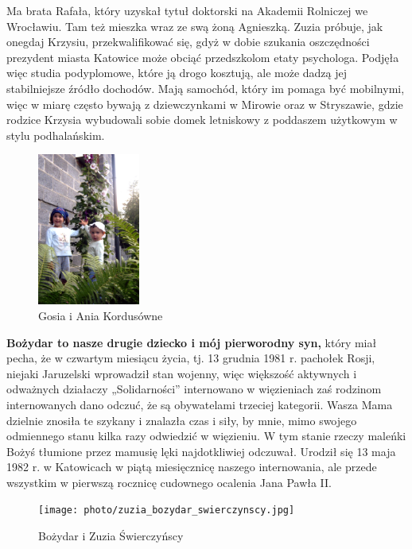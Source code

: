 Ma brata Rafała, który uzyskał tytuł doktorski na Akademii Rolniczej we Wrocławiu. Tam też mieszka wraz ze swą żoną Agnieszką. Zuzia próbuje, jak onegdaj Krzysiu, przekwalifikować się, gdyż w dobie szukania oszczędności prezydent miasta Katowice może obciąć przedszkolom etaty psychologa. Podjęła więc studia podyplomowe, które ją drogo kosztują, ale może dadzą jej stabilniejsze źródło dochodów. Mają samochód, który im pomaga być mobilnymi, więc w miarę często bywają z dziewczynkami w Mirowie oraz w Stryszawie, gdzie rodzice Krzysia wybudowali sobie domek letniskowy z poddaszem użytkowym w stylu podhalańskim.
\begin{figure}[!h]
\begin{center}
\includegraphics[width=0.3\textwidth]{photo/gosia_ania_kordus_2.jpg}
\caption{Gosia i Ania Kordusówne}
\end{center}
\end{figure}









\clearpage

\textbf{Bożydar to nasze drugie dziecko i mój pierworodny syn,} który miał pecha, że w czwartym miesiącu życia, tj. 13 grudnia 1981 r. pachołek Rosji, niejaki Jaruzelski wprowadził stan wojenny, więc większość aktywnych i odważnych działaczy „Solidarności” internowano w więzieniach zaś rodzinom internowanych dano odczuć, że są obywatelami trzeciej kategorii. Wasza Mama dzielnie znosiła te szykany i znalazła czas i siły, by mnie, mimo swojego odmiennego stanu kilka razy odwiedzić w więzieniu. W tym stanie rzeczy maleńki Bożyś tłumione przez mamusię lęki najdotkliwiej odczuwał. Urodził się 13 maja 1982 r. w Katowicach w piątą miesięcznicę naszego internowania, ale przede wszystkim w pierwszą rocznicę cudownego ocalenia Jana Pawła II.
\begin{figure}[!h]
\begin{center}
\texttt{[image: photo/zuzia\_bozydar\_swierczynscy.jpg]}
\caption{Bożydar i Zuzia Świerczyńscy}
\end{center}
\end{figure}

